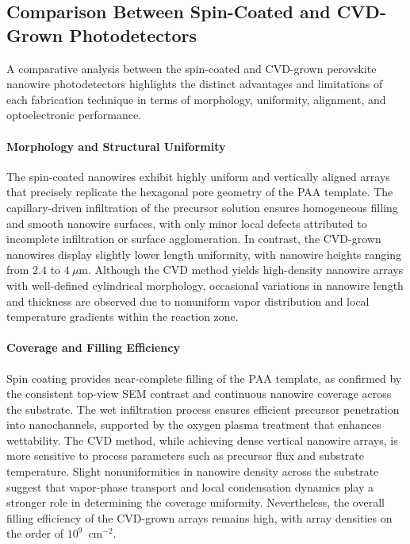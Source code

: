 \documentclass{rapportCS}
\begin{document}
	
	
	\subsection{Comparison Between Spin-Coated and CVD-Grown Photodetectors}
	
	A comparative analysis between the spin-coated and CVD-grown perovskite nanowire photodetectors highlights the distinct advantages and limitations of each fabrication technique in terms of morphology, uniformity, alignment, and optoelectronic performance.
	
	\paragraph{Morphology and Structural Uniformity}
	
	The spin-coated  nanowires exhibit highly uniform and vertically aligned arrays that precisely replicate the hexagonal pore geometry of the PAA template. The capillary-driven infiltration of the precursor solution ensures homogeneous filling and smooth nanowire surfaces, with only minor local defects attributed to incomplete infiltration or surface agglomeration. In contrast, the CVD-grown  nanowires display slightly lower length uniformity, with nanowire heights ranging from $2.4$ to $4~\mu$m. Although the CVD method yields high-density nanowire arrays with well-defined cylindrical morphology, occasional variations in nanowire length and thickness are observed due to nonuniform vapor distribution and local temperature gradients within the reaction zone.
	
	\paragraph{Coverage and Filling Efficiency}
	
	Spin coating provides near-complete filling of the PAA template, as confirmed by the consistent top-view SEM contrast and continuous nanowire coverage across the substrate. The wet infiltration process ensures efficient precursor penetration into nanochannels, supported by the oxygen plasma treatment that enhances wettability. The CVD method, while achieving dense vertical nanowire arrays, is more sensitive to process parameters such as precursor flux and substrate temperature. Slight nonuniformities in nanowire density across the substrate suggest that vapor-phase transport and local condensation dynamics play a stronger role in determining the coverage uniformity. Nevertheless, the overall filling efficiency of the CVD-grown arrays remains high, with array densities on the order of $10^{9}$~cm$^{-2}$.
	
\end{document}

